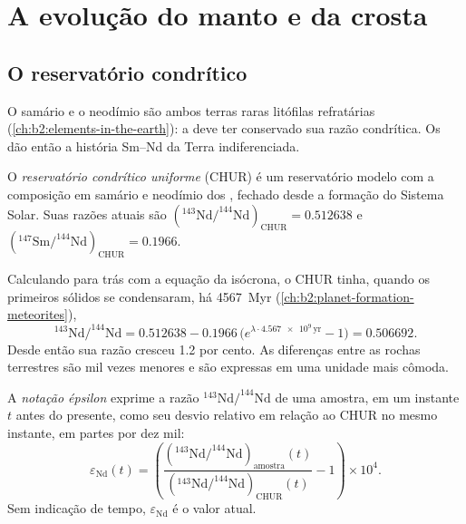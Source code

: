 \section{A evolução do manto e da crosta}

\subsection{O reservatório condrítico}

O samário e o neodímio são ambos terras raras litófilas refratárias
(\cref{ch:b2:elements-in-the-earth}): a  deve ter conservado
sua razão condrítica. Os  dão então a história Sm--Nd da
Terra indiferenciada.

\begin{definition}\label{def:b2:isotope-geochemistry:chur}
O \emph{reservatório condrítico uniforme}
(CHUR) é um reservatório modelo com a composição em samário e neodímio dos
, fechado desde a formação do Sistema Solar. Suas razões
atuais são $(^{143}\mathrm{Nd}/^{144}\mathrm{Nd})_{\mathrm{CHUR}} = 0.512638$ e
$(^{147}\mathrm{Sm}/^{144}\mathrm{Nd})_{\mathrm{CHUR}} = 0.1966$.
\end{definition}

Calculando para trás com a equação da isócrona, o CHUR tinha, quando os primeiros sólidos
se condensaram, há \qty{4567}{Myr} (\cref{ch:b2:planet-formation-meteorites}),
\[
  ^{143}\mathrm{Nd}/^{144}\mathrm{Nd} = 0.512638 - 0.1966\,\bigl(e^{\lambda\cdot
  \num{4.567e9}\,\mathrm{yr}}-1\bigr) = 0.506692 .
\] Desde então sua razão cresceu
1.2 por cento. As diferenças entre as rochas terrestres são mil vezes
menores e são expressas em uma unidade mais cômoda.

\begin{definition}\label{def:b2:isotope-geochemistry:epsilon}
A \emph{notação épsilon} exprime a
razão $^{143}\mathrm{Nd}/^{144}\mathrm{Nd}$ de uma amostra, em um instante $t$ antes do
presente, como seu desvio relativo em relação ao CHUR no mesmo instante, em partes por dez
mil:
\[
  \varepsilon_{\mathrm{Nd}}(t) = \left(
  \frac{(^{143}\mathrm{Nd}/^{144}\mathrm{Nd})_{\text{amostra}}(t)}
       {(^{143}\mathrm{Nd}/^{144}\mathrm{Nd})_{\mathrm{CHUR}}(t)} - 1\right)\times 10^4 .
\]
Sem indicação de tempo, $\varepsilon_{\mathrm{Nd}}$ é o valor atual.
\end{definition}

